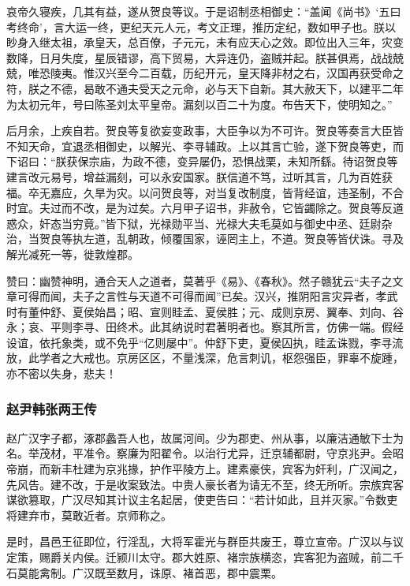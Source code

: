 \documentclass[]{article}
\begin{document}
哀帝久寝疾，几其有益，遂从贺良等议。于是诏制丞相御史：``盖闻《尚书》`五曰考终命'，言大运一终，更纪天元人元，考文正理，推历定纪，数如甲子也。朕以眇身入继太祖，承皇天，总百僚，子元元，未有应天心之效。即位出入三年，灾变数降，日月失度，星辰错谬，高下贸易，大异连仍，盗贼并起。朕甚俱焉，战战兢兢，唯恐陵夷。惟汉兴至今二百载，历纪开元，皇天降非材之右，汉国再获受命之符，朕之不德，曷敢不通夫受天之元命，必与天下自新。其大赦天下，以建平二年为太初元年，号曰陈圣刘太平皇帝。漏刻以百二十为度。布告天下，使明知之。''

后月余，上疾自若。贺良等复欲妄变政事，大臣争以为不可许。贺良等奏言大臣皆不知天命，宜退丞相御史，以解光、李寻辅政。上以其言亡验，遂下贺良等吏，而下诏曰：``朕获保宗庙，为政不德，变异屡仍，恐惧战栗，未知所繇。待诏贺良等建言改元易号，增益漏刻，可以永安国家。朕信道不笃，过听其言，几为百姓获福。卒无嘉应，久旱为灾。以问贺良等，对当复改制度，皆背经谊，违圣制，不合时宜。夫过而不改，是为过矣。六月甲子诏书，非赦令，它皆蠲除之。贺良等反道惑众，奸态当穷竟。''皆下狱，光禄勋平当、光禄大夫毛莫如与御史中丞、廷尉杂治，当贺良等执左道，乱朝政，倾覆国家，诬罔主上，不道。贺良等皆伏诛。寻及解光减死一等，徙敦煌郡。

赞曰：幽赞神明，通合天人之道者，莫著乎《易》、《春秋》。然子赣犹云``夫子之文章可得而闻，夫子之言性与天道不可得而闻''已矣。汉兴，推阴阳言灾异者，孝武时有董仲舒、夏侯始昌；昭、宣则眭孟、夏侯胜；元、成则京房、翼奉、刘向、谷永；哀、平则李寻、田终术。此其纳说时君著明者也。察其所言，仿佛一端。假经设谊，依托象类，或不免乎``亿则屡中''。仲舒下吏，夏侯囚执，眭孟诛戮，李寻流放，此学者之大戒也。京房区区，不量浅深，危言刺讥，枢怨强臣，罪辜不旋踵，亦不密以失身，悲夫！

\hypertarget{header-n5415}{%
\subsubsection{赵尹韩张两王传}\label{header-n5415}}

赵广汉字子都，涿郡蠡吾人也，故属河间。少为郡吏、州从事，以廉洁通敏下士为名。举茂材，平准令。察廉为阳翟令。以治行尤异，迁京辅都尉，守京兆尹。会昭帝崩，而新丰杜建为京兆掾，护作平陵方上。建素豪侠，宾客为奸利，广汉闻之，先风告。建不改，于是收案致法。中贵人豪长者为请无不至，终无所听。宗族宾客谋欲篡取，广汉尽知其计议主名起居，使吏告曰：``若计如此，且并灭家。''令数吏将建弃市，莫敢近者。京师称之。

是时，昌邑王征即位，行淫乱，大将军霍光与群臣共废王，尊立宣帝。广汉以与议定策，赐爵关内侯。迁颍川太守。郡大姓原、褚宗族横恣，宾客犯为盗贼，前二千石莫能禽制。广汉既至数月，诛原、褚首恶，郡中震栗。
\end{document}
